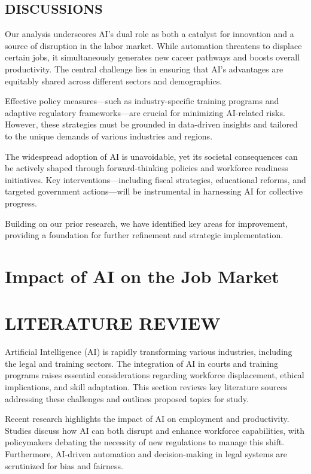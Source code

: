 \documentclass[a4paper,headinclude=on,footinclude=on,12pt,oneside]{scrbook}
\begin{document}
\subsection{DISCUSSIONS}

Our analysis underscores AI’s dual role as both a catalyst for innovation and a source of disruption in the labor market. While automation threatens to displace certain jobs, it simultaneously generates new career pathways and boosts overall productivity. The central challenge lies in ensuring that AI’s advantages are equitably shared across different sectors and demographics.

Effective policy measures—such as industry-specific training programs and adaptive regulatory frameworks—are crucial for minimizing AI-related risks. However, these strategies must be grounded in data-driven insights and tailored to the unique demands of various industries and regions.

The widespread adoption of AI is unavoidable, yet its societal consequences can be actively shaped through forward-thinking policies and workforce readiness initiatives. Key interventions—including fiscal strategies, educational reforms, and targeted government actions—will be instrumental in harnessing AI for collective progress.

Building on our prior research, we have identified key areas for improvement, providing a foundation for further refinement and strategic implementation.



\section{Impact of AI on the Job Market}

\section*{LITERATURE REVIEW}

Artificial Intelligence (AI) is rapidly transforming various industries, including the legal and training sectors. The integration of AI in courts and training programs raises essential considerations regarding workforce displacement, ethical implications, and skill adaptation. This section reviews key literature sources addressing these challenges and outlines proposed topics for study.

Recent research highlights the impact of AI on employment and productivity. Studies discuss how AI can both disrupt and enhance workforce capabilities, with policymakers debating the necessity of new regulations to manage this shift. Furthermore, AI-driven automation and decision-making in legal systems are scrutinized for bias and fairness.
\end{document}
